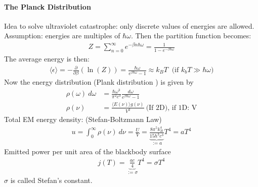 \paragraph{The Planck Distribution}
Idea to solve ultraviolet catastrophe: only discrete values of energies are
allowed. Assumption: energies are multiples of $\hbar \omega$. Then the
partition function becomes:
\begin{align*}
    Z = \sum_{n=0}^\infty e^{-\beta n \hbar \omega} = \frac{1}{1 - e^{-\beta \hbar \omega}}
\end{align*}
The average energy is then:
\begin{align*}
    \langle \epsilon \rangle = - \frac{\partial}{\partial \beta} (\ln(Z))
    = \frac{\hbar \omega}{e^{\beta \hbar \omega} - 1}
    \approx k_B T \ \text{ (if } k_b T \gg \hbar \omega )
\end{align*}
Now the energy distribution (Plank distribution ) is given by
\begin{align*}
    \rho(\omega) \ d \omega &= \frac{\hbar \omega^3}{\pi^2 c^3} \frac{d \omega}{e^{\beta \hbar \omega} -1}
    \\
    \rho(\nu) &= \frac{\langle E(\nu) \rangle g(\nu)}{V^2} \ \text{(If 2D), if 1D: V}
\end{align*}
Total EM energy density: (Stefan-Boltzmann Law)
\begin{align*}
    u = \int_0^\infty \rho(\nu) \ d \nu= \frac{U}{V} =
    \underbrace{\frac{8 \pi^5 k_B^4}{15 h^3 c^3}}_{:= a} T^4
    = a T^4
\end{align*}
Emitted power per unit area of the blackbody surface
\begin{align*}
    j(T) = \underbrace{\frac{a c}{4}}_{:= \sigma} T^4  
    = \sigma T^4
\end{align*}
$\sigma$ is called Stefan's constant.
